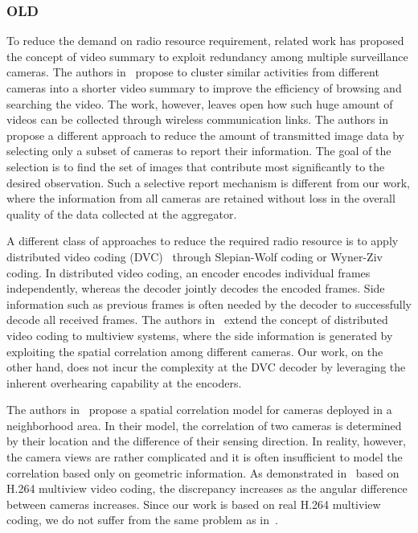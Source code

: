 \subsubsection{OLD}
To reduce the demand on radio resource requirement, related work has proposed the concept of video summary to exploit redundancy among multiple surveillance cameras.
The authors in~\cite{ClusteredSynopsis} propose to cluster similar activities from different cameras into a shorter video summary to improve the efficiency of browsing and searching the video.
The work, however, leaves open how such huge amount of videos can be collected through wireless communication links.
The authors in~\cite{CameraSelection} propose a different approach to reduce the amount of transmitted image data by selecting only a subset of cameras to report their information.
The goal of the selection is to find the set of images that contribute most significantly to the desired observation.
Such a selective report mechanism is different from our work, where the information from all cameras are retained without loss in the overall quality of the data collected at the aggregator.

A different class of approaches to reduce the required radio resource is to apply distributed video coding (DVC)~\cite{DVC} through Slepian-Wolf coding or Wyner-Ziv coding.
In distributed video coding, an encoder encodes individual frames independently, whereas the decoder jointly decodes the encoded frames.
Side information such as previous frames is often needed by the decoder to successfully decode all received frames.
The authors in~\cite{DVCinMVC} extend the concept of distributed video coding to multiview systems, where the side information is generated by exploiting the spatial correlation among different cameras.
Our work, on the other hand, does not incur the complexity at the DVC decoder by leveraging the inherent overhearing capability at the encoders.

The authors in~\cite{SpatialCorrelationModel} propose a spatial correlation model for cameras deployed in a neighborhood area.
In their model, the correlation of two cameras is determined by their location and the difference of their sensing direction.
In reality, however, the camera views are rather complicated and it is often insufficient to model the correlation based only on geometric information.
As demonstrated in~\cite{RealisticModel} based on H.264 multiview video coding, the discrepancy increases as the angular difference between cameras increases.
Since our work is based on real H.264 multiview coding, we do not suffer from the same problem as in~\cite{SpatialCorrelationModel}.
%

